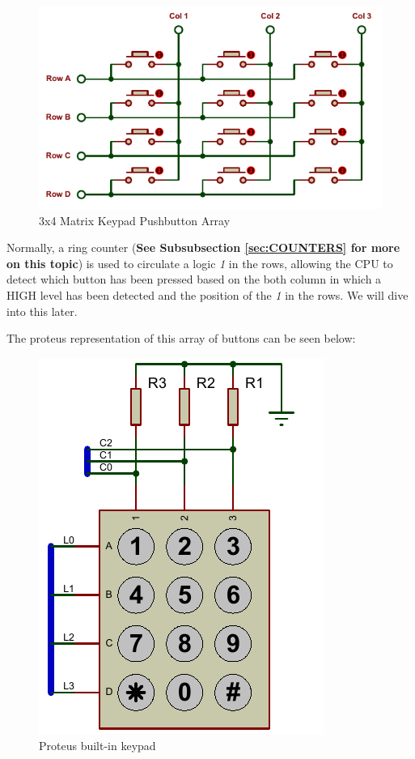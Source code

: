 \begin{figure}[H]
    \centering
    \includegraphics[scale = 1]{Graphics/Practice 5/KEYPAD/KEYPAD_BUTTONS.PDF}
    \caption{3x4 Matrix Keypad Pushbutton Array}
    \label{fig:KEYPAD_BUTTON}
\end{figure}

Normally, a ring counter (\textbf{See Subsubsection \ref{sec:COUNTERS} for more on this topic}) is used to circulate a logic \textit{1} in the rows, allowing the CPU to detect which button has been pressed based on the both column in which a HIGH level has been detected and the position of the \textit{1} in the rows. We will dive into this later.\medskip

The proteus representation of this array of buttons can be seen below:\medskip


\begin{figure}[H]
    \centering
    \includegraphics[scale = 0.85]{Graphics/Practice 5/KEYPAD/KEYPAD.PDF}
    \caption{Proteus built-in keypad}
    \label{fig:PROTEUS_KEYPAD}
\end{figure}

